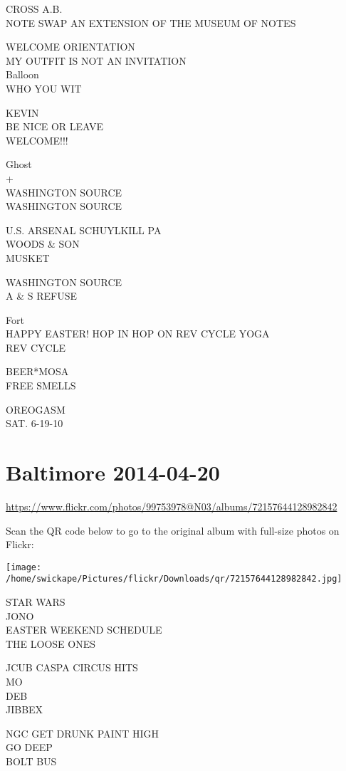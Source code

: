 \documentclass[10pt,letterpaper]{article}
\begin{document}
CROSS A.B.\\
NOTE SWAP AN EXTENSION OF THE MUSEUM OF NOTES

WELCOME ORIENTATION\\
MY OUTFIT IS NOT AN INVITATION\\
Balloon\\
WHO YOU WIT

KEVIN\\
BE NICE OR LEAVE\\
WELCOME!!!

Ghost\\
+\\
WASHINGTON SOURCE\\
WASHINGTON SOURCE

U.S. ARSENAL SCHUYLKILL PA\\
WOODS \& SON\\
MUSKET

WASHINGTON SOURCE\\
A \& S REFUSE

Fort\\
HAPPY EASTER! HOP IN HOP ON REV CYCLE YOGA\\
REV CYCLE

BEER*MOSA\\
FREE SMELLS

OREOGASM\\
SAT. 6{-}19{-}10


\section*{Baltimore 2014-04-20}

\url{https://www.flickr.com/photos/99753978@N03/albums/72157644128982842}

Scan the QR code below to go to the original album with full-size photos on Flickr:

\texttt{[image: /home/swickape/Pictures/flickr/Downloads/qr/72157644128982842.jpg]}


STAR WARS\\
JONO\\
EASTER WEEKEND SCHEDULE\\
THE LOOSE ONES

JCUB CASPA CIRCUS HITS\\
MO\\
DEB\\
JIBBEX

NGC GET DRUNK PAINT HIGH\\
GO DEEP\\
BOLT BUS
\end{document}
